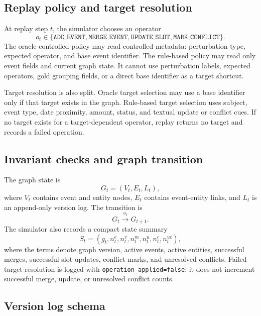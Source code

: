 \documentclass[3p,times,procedia]{elsarticle}
\begin{document}
\subsection{Replay policy and target resolution}

At replay step $t$, the simulator chooses an operator
\begin{equation}
o_t \in \{\texttt{ADD\_EVENT}, \texttt{MERGE\_EVENT}, \texttt{UPDATE\_SLOT}, \texttt{MARK\_CONFLICT}\}.
\end{equation}
The oracle-controlled policy may read controlled metadata: perturbation type, expected operator, and base event identifier. The rule-based policy may read only event fields and current graph state. It cannot use perturbation labels, expected operators, gold grouping fields, or a direct base identifier as a target shortcut.

Target resolution is also split. Oracle target selection may use a base identifier only if that target exists in the graph. Rule-based target selection uses subject, event type, date proximity, amount, status, and textual update or conflict cues. If no target exists for a target-dependent operator, replay returns no target and records a failed operation.

\subsection{Invariant checks and graph transition}

The graph state is
\begin{equation}
G_t = (V_t, E_t, L_t),
\end{equation}
where $V_t$ contains event and entity nodes, $E_t$ contains event-entity links, and $L_t$ is an append-only version log. The transition is
\begin{equation}
G_t \xrightarrow{o_t} G_{t+1}.
\end{equation}
The simulator also records a compact state summary
\begin{equation}
S_t = (g_t, n^e_t, n^v_t, n^m_t, n^u_t, n^c_t, n^{uc}_t),
\end{equation}
where the terms denote graph version, active events, active entities, successful merges, successful slot updates, conflict marks, and unresolved conflicts. Failed target resolution is logged with \texttt{operation\_applied=false}; it does not increment successful merge, update, or unresolved conflict counts.

\subsection{Version log schema}
\end{document}
